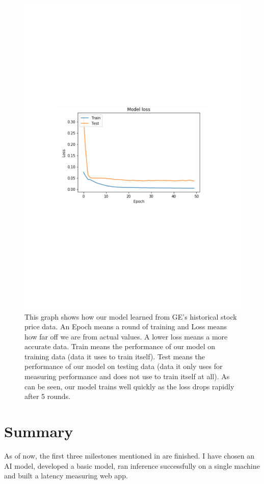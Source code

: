 \documentclass{report}
\begin{document}
\begin{figure}
  \includegraphics[width=\textwidth]{EpochVModelLoss.pdf}
  \caption{This graph shows how our model learned from GE's historical stock price data. An Epoch means a round of training and Loss means how far off we are from actual values. A lower loss means a more accurate data. Train means the performance of our model on training data (data it uses to train itself). Test means the performance of our model on testing data (data it only uses for measuring performance and does not use to train itself at all). As can be seen, our model trains well quickly as the loss drops rapidly after 5 rounds.}
  \label{fig:EpochVModelLoss}
\end{figure}

\section{Summary}
As of now, the first three milestones mentioned in  are finished. I have chosen an AI model, developed a basic model, ran inference successfully on a single machine and built a latency measuring web app.
\end{document}
